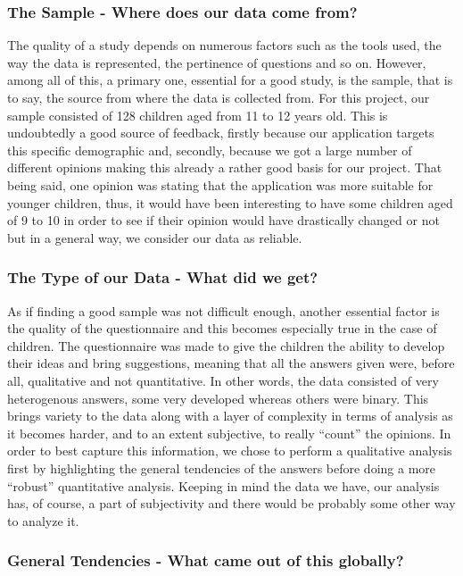 \documentclass[12pt]{scrartcl}
\begin{document}
		\subsubsection*{The Sample - Where does our data come from?}
		
		The quality of a study depends on numerous factors such as the tools used, the way the data is represented, the pertinence of questions and so on. However, among all of this, a primary one, essential for a good study, is the sample, that is to say, the source from where the data is collected from. For this project, our sample consisted of 128 children aged from 11 to 12 years old. This is undoubtedly a good source of feedback, firstly because our application targets this specific demographic and, secondly, because we got a large number of different opinions making this already a rather good basis for our project. That being said, one opinion was stating that the application was more suitable for younger children, thus, it would have been interesting to have some children aged of 9 to 10 in order to see if their opinion would have drastically changed or not but in a general way, we consider our data as reliable. 
		
		\subsubsection*{The Type of our Data - What did we get?}
		
		As if finding a good sample was not difficult enough, another essential factor is the quality of the questionnaire and this becomes especially true in the case of children. The questionnaire was made to give the children the ability to develop their ideas and bring suggestions, meaning that all the answers given were, before all, qualitative and not quantitative. In other words, the data consisted of very heterogenous answers, some very developed whereas others were binary. This brings variety to the data along with a layer of complexity in terms of analysis as it becomes harder, and to an extent subjective, to really ``count'' the opinions. In order to best capture this information, we chose to perform a qualitative analysis first by highlighting the general tendencies of the answers before doing a more ``robust'' quantitative analysis. Keeping in mind the data we have, our analysis has, of course, a part of subjectivity and there would be probably some other way to analyze it. 
		
		\subsubsection*{General Tendencies - What came out of this globally?}
\end{document}
